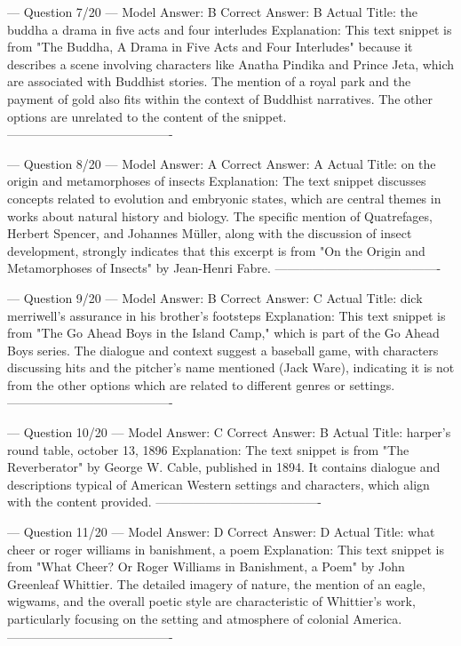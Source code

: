\documentclass[11pt]{article}
\begin{document}
{--- Question 7/20 ---
Model Answer:    B
Correct Answer:  B
Actual Title:    the buddha a drama in five acts and four interludes
Explanation:     This text snippet is from "The Buddha, A Drama in Five Acts and Four Interludes" because it describes a scene involving characters like Anatha Pindika and Prince Jeta, which are associated with Buddhist stories. The mention of a royal park and the payment of gold also fits within the context of Buddhist narratives. The other options are unrelated to the content of the snippet.
----------------------------------------

--- Question 8/20 ---
Model Answer:    A
Correct Answer:  A
Actual Title:    on the origin and metamorphoses of insects
Explanation:     The text snippet discusses concepts related to evolution and embryonic states, which are central themes in works about natural history and biology. The specific mention of Quatrefages, Herbert Spencer, and Johannes Müller, along with the discussion of insect development, strongly indicates that this excerpt is from "On the Origin and Metamorphoses of Insects" by Jean-Henri Fabre.
----------------------------------------

--- Question 9/20 ---
Model Answer:    B
Correct Answer:  C
Actual Title:    dick merriwell's assurance in his brother's footsteps
Explanation:     This text snippet is from "The Go Ahead Boys in the Island Camp," which is part of the Go Ahead Boys series. The dialogue and context suggest a baseball game, with characters discussing hits and the pitcher's name mentioned (Jack Ware), indicating it is not from the other options which are related to different genres or settings.
----------------------------------------

--- Question 10/20 ---
Model Answer:    C
Correct Answer:  B
Actual Title:    harper's round table, october 13, 1896
Explanation:     The text snippet is from "The Reverberator" by George W. Cable, published in 1894. It contains dialogue and descriptions typical of American Western settings and characters, which align with the content provided.
----------------------------------------

--- Question 11/20 ---
Model Answer:    D
Correct Answer:  D
Actual Title:    what cheer or roger williams in banishment, a poem
Explanation:     This text snippet is from "What Cheer? Or Roger Williams in Banishment, a Poem" by John Greenleaf Whittier. The detailed imagery of nature, the mention of an eagle, wigwams, and the overall poetic style are characteristic of Whittier's work, particularly focusing on the setting and atmosphere of colonial America.
----------------------------------------

}
\end{document}
